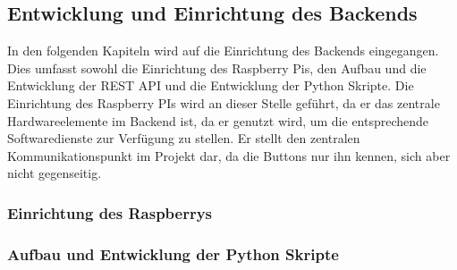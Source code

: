 \newpage

\subsection{Entwicklung und Einrichtung des Backends}  
\label{sec:Entwicklung und Einrichtung des Backends-1} 

In den folgenden Kapiteln wird auf die Einrichtung des Backends eingegangen. Dies umfasst sowohl die Einrichtung des Raspberry Pis, den Aufbau und die Entwicklung der REST API und die Entwicklung der Python Skripte. Die Einrichtung des Raspberry PIs wird an dieser Stelle geführt, da er das zentrale Hardwareelemente im Backend ist, da er genutzt wird, um die entsprechende Softwaredienste zur Verfügung zu stellen. Er stellt den zentralen Kommunikationspunkt im Projekt dar, da die Buttons nur ihn kennen, sich aber nicht gegenseitig. 

\subsubsection{Einrichtung des Raspberrys}  
\label{sec:Einrichtung des Raspberrys-1}



\subsubsection{Aufbau und Entwicklung der Python Skripte}  
\label{sec:Aufbau und Entwicklung der Python Skripte-1}



\newpage